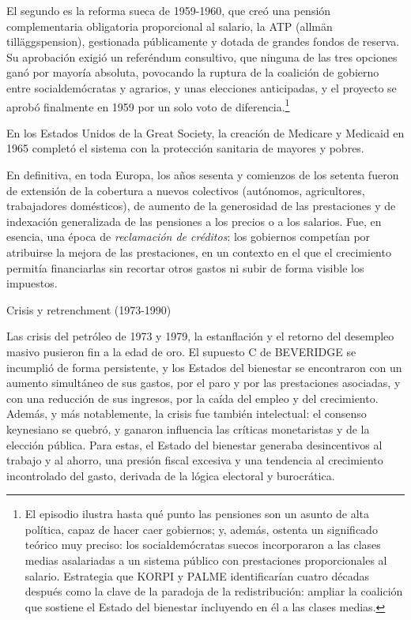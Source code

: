 \documentclass[10pt,a4paper]{article}
\begin{document}
El segundo es la reforma sueca de 1959-1960, que creó una pensión complementaria obligatoria proporcional al salario, la ATP (allmän tilläggspension), gestionada públicamente y dotada de grandes fondos de reserva. Su aprobación exigió un referéndum consultivo, que ninguna de las tres opciones ganó por mayoría absoluta, povocando la ruptura de la coalición de gobierno entre socialdemócratas y agrarios, y unas elecciones anticipadas, y el proyecto se aprobó finalmente en 1959 por un solo voto de diferencia.\footnote{
El episodio ilustra hasta qué punto las pensiones son un asunto de alta política, capaz de hacer caer gobiernos; y, además, ostenta un significado teórico muy preciso: los socialdemócratas suecos incorporaron a las clases medias asalariadas a un sistema público con prestaciones proporcionales al salario. Estrategia que KORPI y PALME identificarían cuatro décadas después como la clave de la paradoja de la redistribución: ampliar la coalición que sostiene el Estado del bienestar incluyendo en él a las clases medias.
}

En los Estados Unidos de la Great Society, la creación de Medicare y Medicaid en 1965 completó el sistema con la protección sanitaria de mayores y pobres. 

En definitiva, en toda Europa, los años sesenta y comienzos de los setenta fueron de extensión de la cobertura a nuevos colectivos (autónomos, agricultores, trabajadores domésticos), de aumento de la generosidad de las prestaciones y de indexación generalizada de las pensiones a los precios o a los salarios. Fue, en esencia, una época de \textit{reclamación de créditos}: los gobiernos competían por atribuirse la mejora de las prestaciones, en un contexto en el que el crecimiento permitía financiarlas sin recortar otros gastos ni subir de forma visible los impuestos.

Crisis y retrenchment (1973-1990)

Las crisis del petróleo de 1973 y 1979, la estanflación y el retorno del desempleo masivo pusieron fin a la edad de oro. El supuesto C de BEVERIDGE se incumplió de forma persistente, y los Estados del bienestar se encontraron con un aumento simultáneo de sus gastos, por el paro y por las prestaciones asociadas, y con una reducción de sus ingresos, por la caída del empleo y del crecimiento. Además, y más notablemente, la crisis fue también intelectual: el consenso keynesiano se quebró, y ganaron influencia las críticas monetaristas y de la elección pública. Para estas, el Estado del bienestar generaba desincentivos al trabajo y al ahorro, una presión fiscal excesiva y una tendencia al crecimiento incontrolado del gasto, derivada de la lógica electoral y burocrática.
\end{document}
